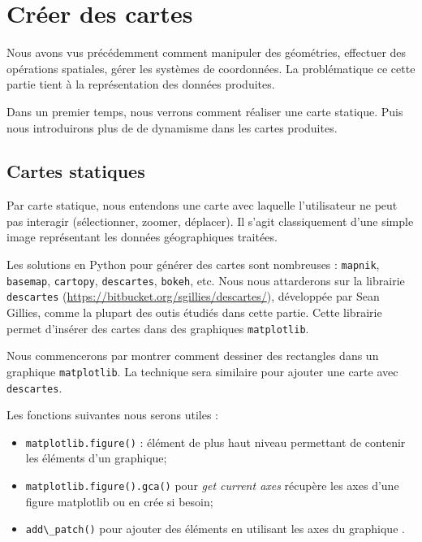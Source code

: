 \documentclass[11pt]{article}
\newcommand{\passthrough}[1]{#1}
\def\tightlist{}
\begin{document}
\hypertarget{cruxe9er-des-cartes}{%
\section{Créer des cartes}\label{cruxe9er-des-cartes}}

Nous avons vus précédemment comment manipuler des géométries, effectuer
des opérations spatiales, gérer les systèmes de coordonnées. La
problématique ce cette partie tient à la représentation des données
produites.

Dans un premier temps, nous verrons comment réaliser une carte statique.
Puis nous introduirons plus de de dynamisme dans les cartes produites.

\hypertarget{cartes-statiques}{%
\subsection{Cartes statiques}\label{cartes-statiques}}

Par carte statique, nous entendons une carte avec laquelle l'utilisateur
ne peut pas interagir (sélectionner, zoomer, déplacer). Il s'agit
classiquement d'une simple image représentant les données géographiques
traitées.

Les solutions en Python pour générer des cartes sont nombreuses :
\passthrough{\lstinline!mapnik!}, \passthrough{\lstinline!basemap!},
\passthrough{\lstinline!cartopy!}, \passthrough{\lstinline!descartes!},
\passthrough{\lstinline!bokeh!}, etc. Nous nous attarderons sur la
librairie \passthrough{\lstinline!descartes!}
(\url{https://bitbucket.org/sgillies/descartes/}), développée par Sean
Gillies, comme la plupart des outis étudiés dans cette partie. Cette
librairie permet d'insérer des cartes dans des graphiques
\passthrough{\lstinline!matplotlib!}.

Nous commencerons par montrer comment dessiner des rectangles dans un
graphique \passthrough{\lstinline!matplotlib!}. La technique sera
similaire pour ajouter une carte avec
\passthrough{\lstinline!descartes!}.

Les fonctions suivantes nous serons utiles :

\begin{itemize}
\tightlist
\item
  \passthrough{\lstinline!matplotlib.figure()!} : élément de plus haut
  niveau permettant de contenir les éléments d'un graphique;
\item
  \passthrough{\lstinline!matplotlib.figure().gca()!} pour \emph{get
  current axes} récupère les axes d'une figure matplotlib ou en crée si
  besoin;
\item
  \passthrough{\lstinline!add\_patch()!} pour ajouter des éléments en
  utilisant les axes du graphique .
\end{itemize}
\end{document}

